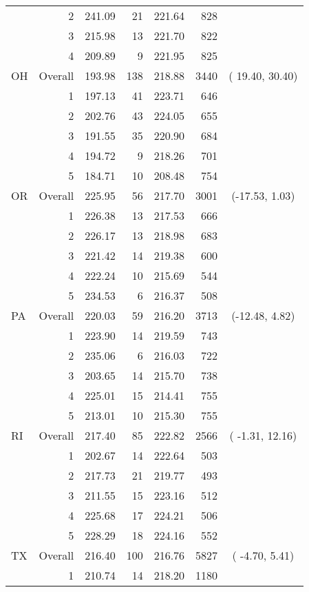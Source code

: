 \begin{longtable}{lrrr@{\extracolsep{.25cm}}rrc}
   & 2 & 241.09 &  21 & 221.64 & 828 &  \\ 
   & 3 & 215.98 &  13 & 221.70 & 822 &  \\ 
   & 4 & 209.89 &   9 & 221.95 & 825 &  \\ 
   \hline
OH & Overall & 193.98 & 138 & 218.88 & 3440 & ( 19.40,  30.40) \\ 
   & 1 & 197.13 &  41 & 223.71 & 646 &  \\ 
   & 2 & 202.76 &  43 & 224.05 & 655 &  \\ 
   & 3 & 191.55 &  35 & 220.90 & 684 &  \\ 
   & 4 & 194.72 &   9 & 218.26 & 701 &  \\ 
   & 5 & 184.71 &  10 & 208.48 & 754 &  \\ 
   \hline
OR & Overall & 225.95 &  56 & 217.70 & 3001 & (-17.53,   1.03) \\ 
   & 1 & 226.38 &  13 & 217.53 & 666 &  \\ 
   & 2 & 226.17 &  13 & 218.98 & 683 &  \\ 
   & 3 & 221.42 &  14 & 219.38 & 600 &  \\ 
   & 4 & 222.24 &  10 & 215.69 & 544 &  \\ 
   & 5 & 234.53 &   6 & 216.37 & 508 &  \\ 
   \hline
PA & Overall & 220.03 &  59 & 216.20 & 3713 & (-12.48,   4.82) \\ 
   & 1 & 223.90 &  14 & 219.59 & 743 &  \\ 
   & 2 & 235.06 &   6 & 216.03 & 722 &  \\ 
   & 3 & 203.65 &  14 & 215.70 & 738 &  \\ 
   & 4 & 225.01 &  15 & 214.41 & 755 &  \\ 
   & 5 & 213.01 &  10 & 215.30 & 755 &  \\ 
   \hline
RI & Overall & 217.40 &  85 & 222.82 & 2566 & ( -1.31,  12.16) \\ 
   & 1 & 202.67 &  14 & 222.64 & 503 &  \\ 
   & 2 & 217.73 &  21 & 219.77 & 493 &  \\ 
   & 3 & 211.55 &  15 & 223.16 & 512 &  \\ 
   & 4 & 225.68 &  17 & 224.21 & 506 &  \\ 
   & 5 & 228.29 &  18 & 224.16 & 552 &  \\ 
   \hline
TX & Overall & 216.40 & 100 & 216.76 & 5827 & ( -4.70,   5.41) \\ 
   & 1 & 210.74 &  14 & 218.20 & 1180 &  \\ 

\end{longtable}
